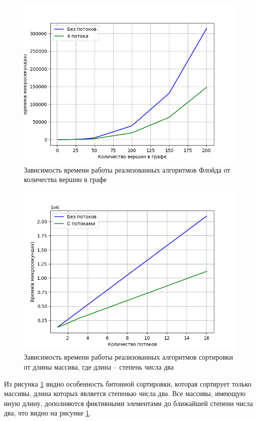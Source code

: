 \begin{figure}[H]
	\centering
	\includegraphics[width=140mm]{images/result}
	\caption{Зависимость времени работы реализованных алгоритмов Флойда от количества вершин в графе}
	\label{img:result}
\end{figure}
\begin{figure}[H]
	\centering
	\includegraphics[width=140mm]{images/resultParallel}
	\caption{Зависимость времени работы реализованных алгоритмов сортировки от длины массива, где длина -- степень числа два}
	\label{img:resultParallel}
\end{figure}

\clearpage
Из рисунка \ref{img:result} видно особенность битонной сортировки, которая сортирует только массивы, длина которых является степенью числа два. Все массивы, имеющую иную длину, дополняются фиктивными элементами до ближайшей степени числа два, что видно на рисунке \ref{img:result}. 

